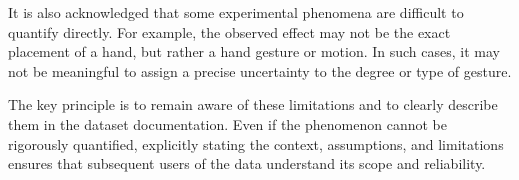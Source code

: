 It is also acknowledged that some experimental phenomena are difficult to quantify directly. For example, the observed effect may not be the exact placement of a hand, but rather a hand gesture or motion. In such cases, it may not be meaningful to assign a precise uncertainty to the degree or type of gesture.

The key principle is to remain aware of these limitations and to clearly describe them in the dataset documentation. Even if the phenomenon cannot be rigorously quantified, explicitly stating the context, assumptions, and limitations ensures that subsequent users of the data understand its scope and reliability.
